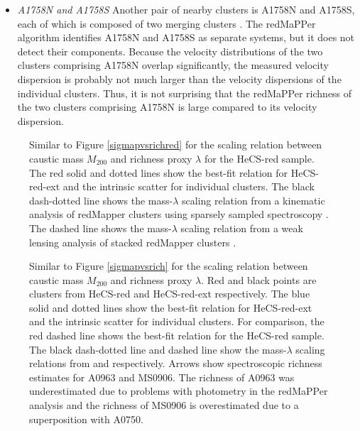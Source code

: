 \begin{itemize}
\item{\em A1758N and A1758S} Another pair of nearby clusters is A1758N and 
A1758S, each of which is composed of two merging clusters \citep{david04,okabe08,ragozzine12}. 
The redMaPPer algorithm identifies A1758N and A1758S as separate systems, 
but it does not detect their components.  Because the velocity distributions of 
the two clusters comprising A1758N overlap significantly, the measured 
velocity dispersion is probably not much larger than the velocity dispersions
of the individual clusters.  Thus, it is not surprising that the redMaPPer richness of the
two clusters comprising A1758N is large compared to its velocity dispersion.  

\end{itemize}


\begin{figure} 
\caption{\label{m200vslambdared} Similar to Figure \ref{sigmapvsrichred} for the scaling relation between caustic mass $M_{200}$  
and richness proxy $\lambda$ for the HeCS-red sample.
The red solid and dotted lines show the best-fit relation for HeCS-red-ext 
and the intrinsic scatter for individual clusters.  
The black dash-dotted line shows the mass-$\lambda$ scaling relation 
from a kinematic analysis of redMapper clusters using sparsely sampled spectroscopy \citep{farahi16}.  
The dashed line shows the mass-$\lambda$ scaling relation from a weak lensing analysis of stacked redMapper clusters \citep{simet17a}.
}
\end{figure}

\begin{figure} 
\caption{\label{m200vslambda} Similar to Figure \ref{sigmapvsrich} for the scaling relation between caustic mass $M_{200}$  
and richness proxy $\lambda$.
Red and black points are clusters from HeCS-red and HeCS-red-ext respectively.
The blue solid and dotted lines show the best-fit relation for HeCS-red-ext 
and the intrinsic scatter for individual clusters.  For comparison, the red dashed line 
shows the best-fit relation for the HeCS-red sample.
The black dash-dotted line and dashed line show the mass-$\lambda$ scaling relations %
from \citet{farahi16} and \citet{simet17a} respectively. 
Arrows show spectroscopic richness estimates for A0963 and MS0906.  The richness of A0963 was underestimated due to problems with photometry in the redMaPPer analysis and the richness of MS0906 is overestimated due to a superposition with A0750. 
}
\end{figure}



